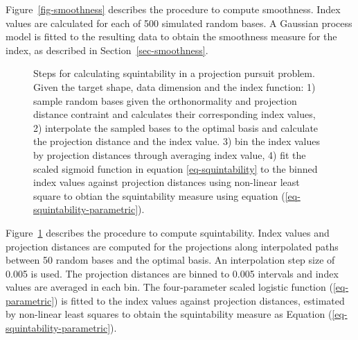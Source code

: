 \documentclass[
  12pt,
]{interact}
\theoremstyle{plain}
\begin{document}
Figure~\ref{fig-smoothness} describes the procedure to compute
smoothness. Index values are calculated for each of 500 simulated random
bases. A Gaussian process model is fitted to the resulting data to
obtain the smoothness measure for the index, as described in
Section~\ref{sec-smoothness}.

\begin{figure}


\caption{\label{fig-squintability}Steps for calculating squintability in
a projection pursuit problem. Given the target shape, data dimension and
the index function: 1) sample random bases given the orthonormality and
projection distance contraint and calculates their corresponding index
values, 2) interpolate the sampled bases to the optimal basis and
calculate the projection distance and the index value. 3) bin the index
values by projection distances through averaging index value, 4) fit the
scaled sigmoid function in equation \eqref{eq-squintability} to the
binned index values against projection distances using non-linear least
square to obtian the squintability measure using equation
(\ref{eq-squintability-parametric}).}

\end{figure}%

Figure~\ref{fig-squintability} describes the procedure to compute
squintability. Index values and projection distances are computed for
the projections along interpolated paths between 50 random bases and the
optimal basis. An interpolation step size of 0.005 is used. The
projection distances are binned to 0.005 intervals and index values are
averaged in each bin. The four-parameter scaled logistic function
(\ref{eq-parametric}) is fitted to the index values against projection
distances, estimated by non-linear least squares to obtain the
squintability measure as Equation (\ref{eq-squintability-parametric}).
\end{document}
